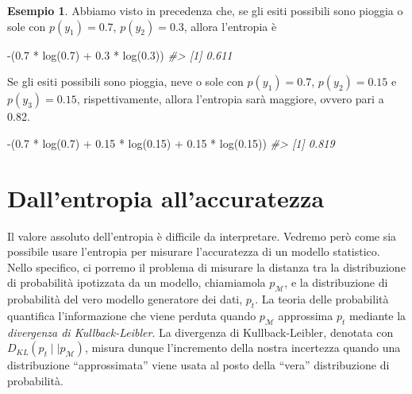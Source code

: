 \documentclass[
  10pt,
  italian,
  a4paper,
  extrafontsizes,onecolumn,openright
  ]{memoir}
\newenvironment{Shaded}{\begin{snugshade}}{\end{snugshade}}
\newcommand{\CommentTok}[1]{\textcolor[rgb]{0.56,0.35,0.01}{\textit{#1}}}
\newcommand{\FloatTok}[1]{\textcolor[rgb]{0.00,0.00,0.81}{#1}}
\newcommand{\FunctionTok}[1]{\textcolor[rgb]{0.00,0.00,0.00}{#1}}
\newcommand{\NormalTok}[1]{#1}
\newcommand{\SpecialCharTok}[1]{\textcolor[rgb]{0.00,0.00,0.00}{#1}}
\theoremstyle{definition}
\theoremstyle{definition}
\newtheorem{example}{Esempio}[chapter]
\theoremstyle{definition}
\theoremstyle{definition}
\theoremstyle{remark}
\begin{document}
\begin{example}

Abbiamo visto in precedenza che, se gli esiti possibili sono pioggia o sole con \(p(y_1) = 0.7\), \(p(y_2) = 0.3\), allora l'entropia è

\begin{Shaded}
\begin{Highlighting}[]
\SpecialCharTok{{-}}\NormalTok{(}\FloatTok{0.7} \SpecialCharTok{*} \FunctionTok{log}\NormalTok{(}\FloatTok{0.7}\NormalTok{) }\SpecialCharTok{+} \FloatTok{0.3} \SpecialCharTok{*} \FunctionTok{log}\NormalTok{(}\FloatTok{0.3}\NormalTok{))}
\CommentTok{\#\textgreater{} [1] 0.611}
\end{Highlighting}
\end{Shaded}

\noindent
Se gli esiti possibili sono pioggia, neve o sole con \(p(y_1) = 0.7\), \(p(y_2) = 0.15\) e \(p(y_3) = 0.15\), rispettivamente, allora l'entropia sarà maggiore, ovvero pari a 0.82.

\begin{Shaded}
\begin{Highlighting}[]
\SpecialCharTok{{-}}\NormalTok{(}\FloatTok{0.7} \SpecialCharTok{*} \FunctionTok{log}\NormalTok{(}\FloatTok{0.7}\NormalTok{) }\SpecialCharTok{+} \FloatTok{0.15} \SpecialCharTok{*} \FunctionTok{log}\NormalTok{(}\FloatTok{0.15}\NormalTok{) }\SpecialCharTok{+} \FloatTok{0.15} \SpecialCharTok{*} \FunctionTok{log}\NormalTok{(}\FloatTok{0.15}\NormalTok{))}
\CommentTok{\#\textgreater{} [1] 0.819}
\end{Highlighting}
\end{Shaded}

\end{example}

\hypertarget{dallentropia-allaccuratezza}{%
\section{Dall'entropia all'accuratezza}\label{dallentropia-allaccuratezza}}

Il valore assoluto dell'entropia è difficile da interpretare. Vedremo però come sia possibile usare l'entropia per misurare l'accuratezza di un modello statistico. Nello specifico, ci porremo il problema di misurare la distanza tra la distribuzione di probabilità ipotizzata da un modello, chiamiamola \(p_{\mathcal{M}}\), e la distribuzione di probabilità del vero modello generatore dei dati, \(p_t\). La teoria delle probabilità quantifica l'informazione che viene perduta quando \(p_{\mathcal{M}}\) approssima \(p_t\) mediante la \emph{divergenza di Kullback-Leibler}. La divergenza di Kullback-Leibler, denotata con \(D_{KL}(p_t \mid\mid p_{\mathcal{M}})\), misura dunque l'incremento della nostra incertezza quando una distribuzione ``approssimata'' viene usata al posto della ``vera'' distribuzione di probabilità.
\end{document}
